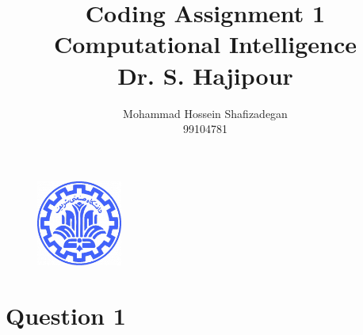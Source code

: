 \documentclass[]{article}
\author{
	Mohammad Hossein Shafizadegan\\
	99104781
}
\title{
	Coding Assignment 1 \\
	Computational Intelligence  \\
	Dr. S. Hajipour
}
\begin{document}
	\begin{figure}
		\includegraphics[width=0.25\textwidth]{Fig/Sharif.png}
		\centering
	\end{figure}
	\maketitle
	\tableofcontents
	\newpage
	\section{Question 1}
\end{document}
